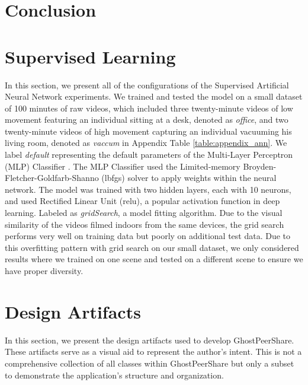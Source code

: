 \documentclass [11pt, proquest] {uwthesis}[2020/02/24]
\begin{document}

\chapter{Conclusion}


%
%
\nocite{*}   %


%
%
\appendix
\raggedbottom\sloppy
 
 
\chapter{Supervised Learning}

In this section, we present all of the configurations of the Supervised Artificial Neural Network experiments. We trained and tested the model on a small dataset of 100 minutes of raw videos, which included three twenty-minute videos of low movement featuring an individual sitting at a desk, denoted as \textit{office}, and two twenty-minute videos of high movement capturing an individual vacuuming his living room, denoted as \textit{vaccum} in Appendix Table \ref{table:appendix_ann}. We label \textit{default} representing the default parameters of the Multi-Layer Perceptron (MLP) Classifier \cite{scikit-learn}. The MLP Classifier used the Limited-memory Broyden-Fletcher-Goldfarb-Shanno (lbfgs) solver to apply weights within the neural network. The model was trained with two hidden layers, each with 10 neurons, and used Rectified Linear Unit (relu), a popular activation function in deep learning. Labeled as \textit{gridSearch}, a model fitting algorithm. Due to the visual similarity of the videos filmed indoors from the same devices, the grid search performs very well on training data but poorly on additional test data. Due to this overfitting pattern with grid search on our small dataset, we only considered results where we trained on one scene and tested on a different scene to ensure we have proper diversity.
 


\chapter{Design Artifacts}

In this section, we present the design artifacts used to develop GhostPeerShare. These artifacts serve as a visual aid to represent the author's intent. This is not a comprehensive collection of all classes within GhostPeerShare but only a subset to demonstrate the application's structure and organization.
\end{document}
